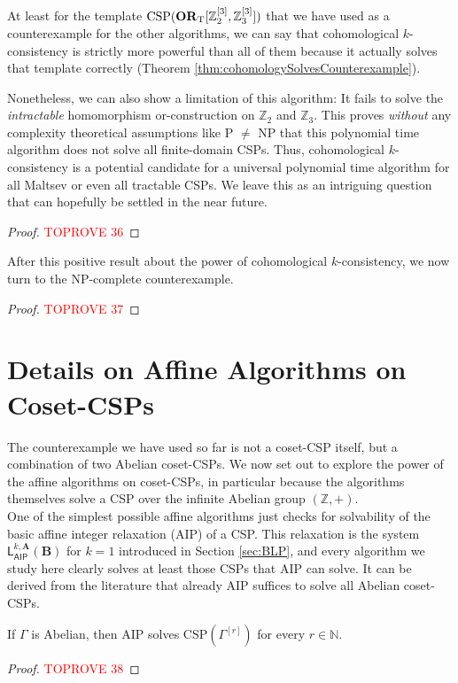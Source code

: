 \documentclass[a4paper,english, thm-restate]{lipics-v2021}
\newcommand{\StructA}{\mathbf{A}}
\newcommand{\StructB}{\mathbf{B}}
\newcommand{\CSP}[1]{\mathrm{CSP}(#1)}
\newcommand{\leqs}{\mathsf{L}}
\newcommand{\aipk}[3]{\leqs^{#1,#2}_{\mathsf{AIP}} (#3)}
\newcommand{\bbN}{\mathbb{N}}
\newcommand{\bbZ}{\mathbb{Z}}
\newcommand{\CosetGrpTmplt}[2]{#1^{[#2]}}
\begin{document}
	At least for the template $\CSP{\ZtwoOrThreeInst}$ that we have used as a counterexample for the other algorithms, we can say that cohomological $k$-consistency is strictly more powerful than all of them because it actually solves that template correctly (Theorem \ref{thm:cohomologySolvesCounterexample}). 
	
	Nonetheless, we can also show a limitation of this algorithm: It fails to solve the \emph{intractable} homomorphism or-construction on $\bbZ_2$ and $\bbZ_3$. This proves \emph{without} any complexity theoretical assumptions like P $\neq$ NP that this polynomial time algorithm does not solve all finite-domain CSPs.
	Thus, cohomological $k$-consistency is a potential candidate for a universal polynomial time algorithm for all Maltsev or even all tractable CSPs. We leave this as an intriguing question that can hopefully be settled in the near future.
	
	\cohomologySolvesCounterexample*		
	\begin{proof}\textcolor{red}{TOPROVE 36}\end{proof}		
	
	After this positive result about the power of cohomological $k$-consistency, we now turn to the NP-complete counterexample.
	
	\cohomologyDoesNotSolveAllCSP*
	\begin{proof}\textcolor{red}{TOPROVE 37}\end{proof}
	
	
	
	
	
	
	
	\section{Details on Affine Algorithms on Coset-CSPs}	
	\label{app:groupStuff}
	
	The counterexample we have used so far is not a coset-CSP itself, but a combination of two Abelian coset-CSPs.
	We now set out to explore the power of the affine algorithms on coset-CSPs, in particular because the algorithms themselves 
	solve a CSP over the infinite Abelian group $(\bbZ,+)$.\\
	
	One of the simplest possible affine algorithms just checks for solvability of the basic affine integer relaxation (AIP) of a CSP. 
	This relaxation is the system $\aipk{k}{\StructA}{\StructB}$ for $k=1$ introduced in Section \ref{sec:BLP}, and 
	every algorithm we study here clearly solves at least those CSPs that AIP can solve.
	It can be derived from the literature that already AIP suffices to solve all Abelian coset-CSPs.
	\begin{theorem}
		\label{thm:abelianSolvedByAIP}
		If $\Gamma$ is Abelian, then AIP solves $\CSP{\CosetGrpTmplt{\Gamma}{r}}$ for every $r \in \bbN$.
	\end{theorem}	
	\begin{proof}\textcolor{red}{TOPROVE 38}\end{proof}	
	
\end{document}
